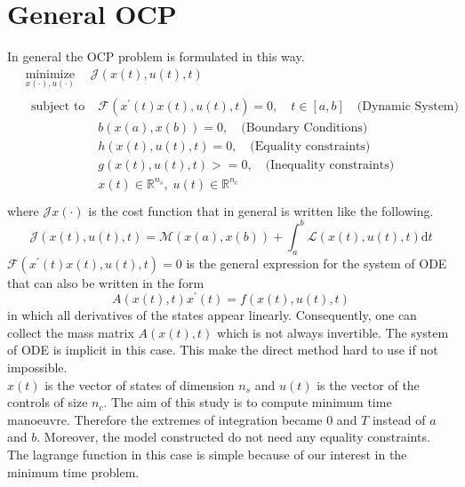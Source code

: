\section{General OCP}
%
In general the OCP problem is formulated in this way.
%
\begin{equation}
    \begin{aligned}
    &\underset{x(\cdot), u(\cdot)}{\operatorname{minimize}} \quad \mathcal{J}(x(t), u(t), t)\\
    &\begin{aligned}
        {\text { subject to }} \;
        & \mathcal{F}(x^{\prime}(t)x(t),u(t),t)=0, \quad t \in[a, b] \quad \text{(Dynamic System)}\\
        & b(x(a),x(b))=0, \quad \text{(Boundary Conditions)}\\
        & h(x(t),u(t),t)=0, \quad \text{(Equality constraints)}\\
        & g(x(t),u(t),t)>=0, \quad \text{(Inequality constraints)}\\
        & x(t) \in \mathbb{R}^{n_s}, \; u(t) \in \mathbb{R}^{n_c}
    \end{aligned}\\
    \end{aligned}
\end{equation}
%
where $\mathcal{J}x(\cdot)$ is the cost function that in general is written like the following.
%
\begin{equation}
    \mathcal{J}(x(t), u(t), t)=\mathcal{M}(x(a), x(b))+\int_{a}^{b} \mathcal{L}(x(t), u(t), t) \mathrm{d} t
\end{equation}
%
$\mathcal{F}(x^{\prime}(t)x(t),u(t),t)=0$ is the general expression for the system of ODE that can also be written in the form
%
\begin{equation}
    A(x(t), t) x^{\prime}(t)=f(x(t), u(t), t)
\end{equation}
%
in which all derivatives of the states appear linearly. Consequently, one can collect the mass matrix $A(x(t), t)$ which is not always invertible. The system of ODE is implicit in this case. This make the direct method hard to use if not impossible.\\
$x(t)$ is the vector of states of dimension $n_s$ and $u(t)$ is the vector of the controls of size $n_c$.
%
The aim of this study is to compute minimum time manoeuvre. Therefore the extremes of integration became $0$ and $T$ instead of $a$ and $b$. Moreover, the model constructed do not need any equality constraints. The lagrange function in this case is simple because of our interest in the minimum time problem.
